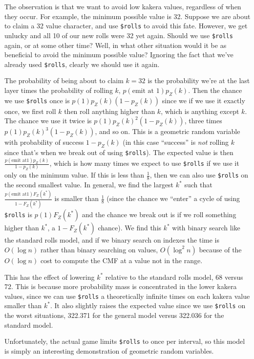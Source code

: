 \documentclass[11pt, oneside]{article}
\theoremstyle{plain}
\theoremstyle{definition}
\begin{document}
The observation is that we want to avoid low kakera values, regardless of
when they occur. For example, the minimum possible value is 32. Suppose we
are about to claim a 32 value character, and use \texttt{\$rolls} to avoid
this fate. However, we get unlucky and all 10 of our new rolls were 32 yet
again. Should we use \texttt{\$rolls} again, or at some other time? Well, in
what other situation would it be as beneficial to avoid the minimum possible
value? Ignoring the fact that we've already used \texttt{\$rolls}, clearly
we should use it again.

The probability of being about to claim \( k = 32 \) is the probability we're
at the last layer times the probability of rolling \( k \), \( p(\text{emit
at } 1) p_Z(k) \). Then the chance we use \texttt{\$rolls} once is \( p(1)
p_Z (k) ( 1 - p_Z(k) ) \) since we if we use it exactly once, we first
roll \( k \) then roll anything higher than \( k \), which is anything
except \( k \). The chance we use it twice is \( p(1) p_Z(k)^2 (1 - p_Z(k))
\), three times \( p(1) p_Z(k)^3 (1 - p_Z(k)) \), and so on. This is a
geometric random variable with probability of success \( 1 - p_Z(k) \) (in
this case \enquote{success} is \textit{not} rolling \( k \) since that's
when we break out of using \texttt{\$rolls}). The expected value is then \(
\frac{p(\text{emit at} 1) p_Z(k)}{1 - p_Z(k)} \), which is how many times we
expect to use \texttt{\$rolls} if we use it only on the minimum value. If
this is less than \( \frac{1}{8} \), then we can also use \texttt{\$rolls}
on the second smallest value. In general, we find the largest \( k^* \) such
that \( \frac{p(\text{emit at} 1) F_Z(k^*)}{1 - F_Z(k^*)} \) is smaller than
\( \frac{1}{8} \) (since the chance we \enquote{enter} a cycle of using
\texttt{\$rolls} is \( p(1) F_Z(k^*) \) and the chance we break out is if
we roll something higher than \( k^* \), a \( 1 - F_Z(k^*) \) chance). We
find this \( k^* \) with binary search like the standard rolls model, and if
we binary search on indexes the time is \( O(\log n) \) rather than binary
searching on values, \( O(\log^2 n) \) because of the \( O(\log n) \) cost
to compute the CMF at a value not in the range.

This has the effect of lowering \( k^* \) relative to the standard rolls model,
68 versus 72. This is because more probability mass is concentrated in the
lower kakera values, since we can use \texttt{\$rolls} a theoretically infinite
times on each kakera value smaller than \( k^* \). It also slightly raises the
expected value since we use \texttt{\$rolls} on the worst situations, 322.371
for the general model versus 322.036 for the standard model.

Unfortunately, the actual game limits \texttt{\$rolls}
to once per interval, so this model is simply an
interesting demonstration of geometric random variables.

\label{here2}

\end{document}
